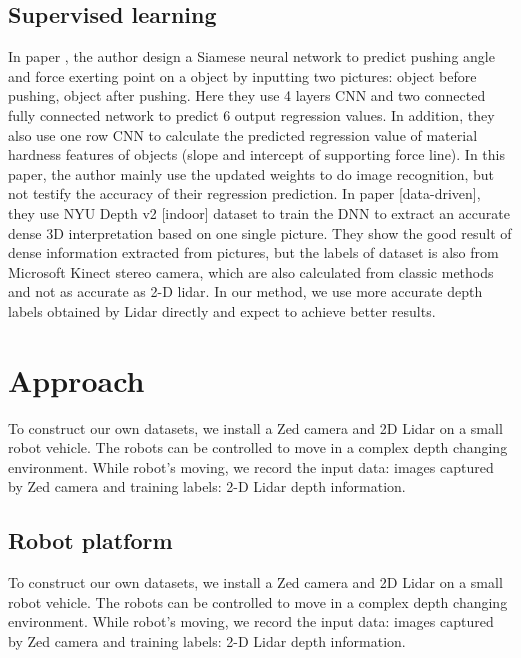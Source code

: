 \documentclass[10pt,twocolumn,letterpaper]{article}
\begin{document}
\subsection{Supervised learning}

In paper \cite{pinto2016curious}, the author design a Siamese neural network to predict pushing angle and force exerting point on a object by inputting two pictures: object before pushing, object after pushing. Here they use 4 layers CNN and two connected fully connected network to predict 6 output regression values. In addition, they also use one row CNN to calculate the  predicted regression value of material hardness features of objects (slope and intercept of supporting force line). In this paper, the author mainly use the updated weights to do image recognition, but not testify the accuracy of their regression prediction. In paper [data-driven], they use NYU Depth v2 [indoor] dataset to train the DNN to extract an accurate dense 3D interpretation based on one single picture. They show the good result of dense information extracted from pictures, but the labels of dataset is also from Microsoft Kinect stereo camera, which are also calculated from classic methods and not as accurate as 2-D lidar. In our method, we use more accurate depth labels obtained by Lidar directly and expect to achieve better results. 
\section{Approach}
To construct our own datasets, we install a Zed camera and 2D Lidar on a small robot vehicle. The robots can be controlled to move in a complex depth changing environment. While robot’s moving, we record the input data: images captured by Zed camera and training labels: 2-D Lidar depth information.
\subsection{Robot platform}
To construct our own datasets, we install a Zed camera and 2D Lidar on a small robot vehicle. The robots can be controlled to move in a complex depth changing environment. While robot’s moving, we record the input data: images captured by Zed camera and training labels: 2-D Lidar depth information.
\end{document}
